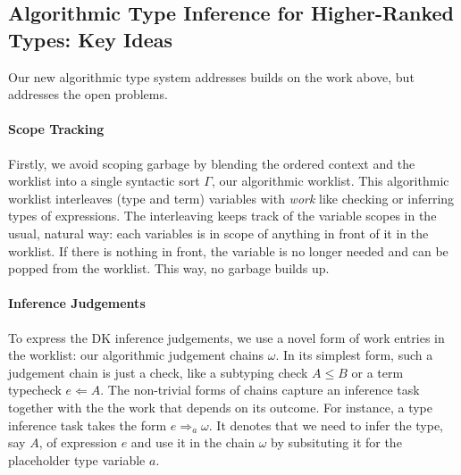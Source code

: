 \subsection{Algorithmic Type Inference for Higher-Ranked Types: Key Ideas}

Our new algorithmic type system addresses builds on the work above, but
addresses the open problems. 

\paragraph{Scope Tracking}
Firstly, we avoid scoping garbage by blending the ordered context and the
worklist into a single syntactic sort $\Gamma$, our algorithmic worklist. This
algorithmic worklist interleaves (type and term) variables with \emph{work}
like checking or inferring types of expressions. The interleaving keeps track
of the variable scopes in the usual, natural way: each variables is in scope of
anything in front of it in the worklist. If there is nothing in front, the
variable is no longer needed and can be popped from the worklist. This way, no
garbage builds up.

\paragraph{Inference Judgements}
To express the DK inference judgements, we use a novel form of work entries in
the worklist: our algorithmic judgement chains $\omega$. In its simplest form,
such a judgement chain is just a check, like a subtyping check $A \leq B$ or a
term typecheck $e \Leftarrow A$.  The non-trivial forms of chains capture an
inference task together with the the work that depends on its outcome. For
instance, a type inference task takes the form $e \Rightarrow_a \omega$. It
denotes that we need to infer the type, say $A$, of expression $e$ and use it
in the chain $\omega$ by subsituting it for the placeholder type variable $a$.




